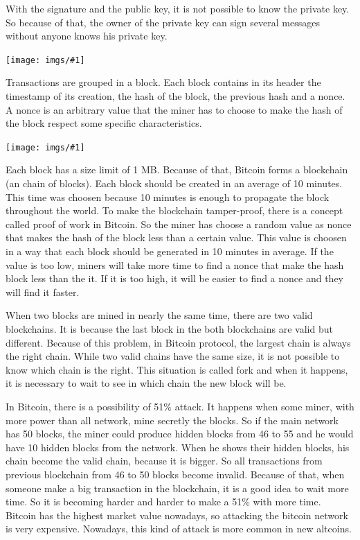 \documentclass[12pt]{article}
\newcommand{\incimg}[1]{\texttt{[image: imgs/\#1]}}
\begin{document}
With the signature and the public key, it is not possible to know the private key.
So because of that, the owner of the private key can sign several messages without anyone knows
his private key.

\incimg{transactions2.jpg}

Transactions are grouped in a block.
Each block contains in its header the timestamp of its creation, the hash of the block,
the previous hash and a nonce.
A nonce is an arbitrary value that the miner has to choose to make the hash of the block respect some
specific characteristics.

\incimg{blockchain.png}

Each block has a size limit of 1 MB.
Because of that, Bitcoin forms a blockchain (an chain of blocks).
Each block should be created in an average of 10 minutes.
This time was choosen because 10 minutes is enough to propagate the block throughout the world.
To make the blockchain tamper-proof, there is a concept called proof of work in Bitcoin.
So the miner has choose a random value as nonce that makes the hash of the block less
than a certain value.
This value is choosen in a way that each block should be generated in 10 minutes in average.
If the value is too low, miners will take more time to find a nonce that make the hash block
less than the it.
If it is too high, it will be easier to find a nonce and they will find it faster.

When two blocks are mined in nearly the same time, there are two valid blockchains.
It is because the last block in the both blockchains are valid but different.
Because of this problem, in Bitcoin protocol, the largest chain is always the right chain.
While two valid chains have the same size, it is not possible to know which chain is the right.
This situation is called fork and when it happens, it is necessary to wait to see in which chain
the new block will be.

In Bitcoin, there is a possibility of 51\% attack.
It happens when some miner, with more power than all network, mine secretly the blocks.
So if the main network has 50 blocks, the miner could produce hidden blocks from 46 to 55
and he would have 10 hidden blocks from the network.
When he shows their hidden blocks, his chain become the valid chain, because it is bigger.
So all transactions from previous blockchain from 46 to 50 blocks become invalid.
Because of that, when someone make a big transaction in the blockchain, it is a good idea
to wait more time.
So it is becoming harder and harder to make a 51\% with more time.
Bitcoin has the highest market value nowadays, so attacking the bitcoin network is very expensive.
Nowadays, this kind of attack is more common in new altcoins.
\end{document}
